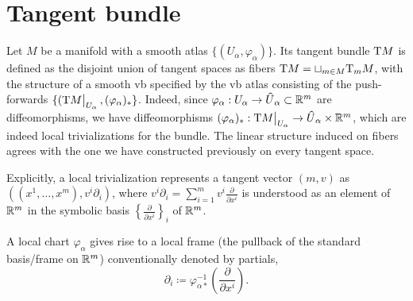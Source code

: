 \section{Tangent bundle}

\begin{defn}
    Let $M$ be a manifold with a smooth atlas $\{(U_\alpha,\varphi_\alpha)\}$. Its tangent bundle $\mathrm{T} M$ is defined as the disjoint union of tangent spaces as fibers $\mathrm{T} M=\sqcup_{m\in M} \mathrm{T}_m M$, with the structure of a smooth \gls{vb} specified by the \gls{vb} atlas consisting of the push-forwards $\{(\restr{\T M}{U_\alpha},(\varphi_\alpha)_\ast\}$. Indeed, since $\varphi_\alpha:U_\alpha\to \wh U_\alpha \subset \bbR^m$ are diffeomorphisms, we have diffeomorphisms $(\varphi_\alpha)_\ast:\restr{\T M}{U_\alpha}\to \wh U_\alpha\times \bbR^m$, which are indeed local trivializations for the bundle. The linear structure induced on fibers agrees with the one we have constructed previously on every tangent space.
\end{defn}

Explicitly, a local trivialization represents a tangent vector $(m,v)$ as $((x^1,\ldots,x^m),v^i\partial_i)$, where $v^i\partial_i=\sum_{i=1}^m v^i\frac{\partial}{\partial x^i}$ is understood as an element of $\mathbb{R}^m$ in the symbolic basis $\left\{\frac{\partial}{\partial x^i}\right\}_i$ of $\mathbb{R}^m$.

A local chart $\varphi_\alpha$ gives rise to a local frame (the pullback of the standard basis/frame on $\mathbb{R}^m$) conventionally denoted by partials, \[\partial_i\coloneqq \varphi_{\alpha\ast}^{-1}\left(\frac{\partial}{\partial x^i}\right).\]


